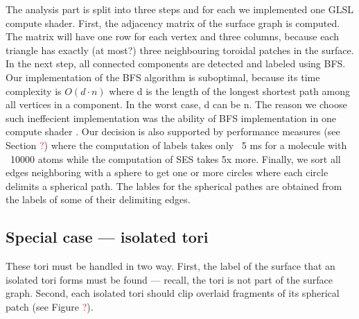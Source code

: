 The analysis part is split into three steps and for each we implemented one GLSL compute shader.
First, the adjacency matrix of the surface graph is computed.
The matrix will have one row for each vertex and three columns, because each triangle has exactly (at most?) three neighbouring toroidal patches in the surface. In the next step, all connected components are detected and labeled using BFS.
Our implementation of the BFS algorithm is suboptimal, because its time complexity is $O(d \cdot n)$ where d is the length of the longest shortest path among all vertices in a component.
In the worst case, d can be n.
The reason we choose such ineffecient implementation was the ability of BFS implementation in one compute shader \cite{merrill2012scalable}.
Our decision is also supported by performance measures (see Section \textcolor{red}{?}) where the computation of labels takes only ~5 ms for a molecule with ~10000 atoms while the computation of SES takes 5x more.
Finally, we sort all edges neighboring with a sphere to get one or more circles where each circle delimits a spherical path.
The lables for the spherical pathes are obtained from the labels of some of their delimiting edges.

\subsection{Special case --- isolated tori}

These tori must be handled in two way.
First, the label of the surface that an isolated tori forms must be found --- recall, the tori is not part of the surface graph.
Second, each isolated tori should clip overlaid fragments of its spherical patch (see Figure \textcolor{red}{?}).


